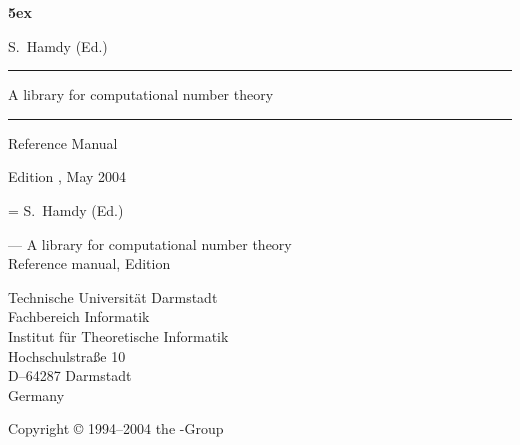 \documentclass[10pt,twoside]{book}
\begin{document}

\begin{titlepage}
  \begin{center}
    \bfseries
    \vglue5ex

    \Large
    S.~Hamdy (Ed.)

    \rule{\textwidth}{4pt}
    \bigskip

    \Huge\LiDIA

    \bigskip\Large
    A library for computational number theory

    \bigskip\bigskip
    \rule{\textwidth}{4pt}

    \bigskip\Huge
    Reference Manual

    \bigskip\Large
    Edition \Version, May 2004
  \end{center}
\end{titlepage}

\begingroup
  \thispagestyle{plain}
  \raggedright\parskip=\baselineskip
  S.~Hamdy (Ed.)
  \par
  \LiDIA --- A library for computational number theory\\
  Reference manual, Edition \Version
  \par
  Technische Universit\"at Darmstadt\\
  Fachbereich Informatik\\
  Institut f\"ur Theoretische Informatik\\
  Hochschulstra{\ss}e 10\\
  D--64287 Darmstadt\\
  Germany
  \par
  Copyright {\copyright} 1994--2004 the \LiDIA-Group
\endgroup
\cleardoublepage

\begingroup
\makeuscoreother
\tableofcontents
\endgroup
\cleardoublepage

\setcounter{page}{1}
















\end{document}
